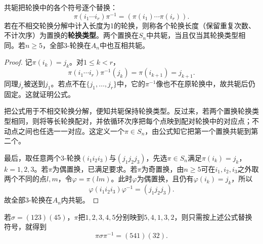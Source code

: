 \begin{proposition}
共轭把轮换中的各个符号逐个替换：
\[
\pi(i_1\cdots i_r)\pi^{-1}
=(\pi(i_1)\cdots\pi(i_r)).
\]
若在不相交轮换分解中计入长度为1的轮换，则称各个轮换长度（保留重复次数、不计次序）为置换的\textbf{轮换类型}。两个置换在$S_n$中共轭，当且仅当其轮换类型相同。若$n\geq5$，全部3-轮换在$A_n$中也互相共轭。
\end{proposition}
\begin{proof}
记$\pi(i_k)=j_k$。对$1\leq k<r$，
\[
\pi(i_1\cdots i_r)\pi^{-1}(j_k)
=\pi(i_{k+1})=j_{k+1}.
\]
同理$j_r$被送到$j_1$。若点不在$\{j_1,\ldots,j_r\}$中，它的$\pi^{-1}$像也不在原轮换中，故共轭后仍固定。这就证明公式。

把公式用于不相交轮换分解，便知共轭保持轮换类型。反过来，若两个置换轮换类型相同，则将等长轮换配对，并依循环次序把每个点映到配对轮换中的对应点；不动点之间也任选一一对应。这定义一个$\pi\in S_n$，由公式知它把第一个置换共轭到第二个。

最后，取任意两个3-轮换$(i_1i_2i_3)$与$(j_1j_2j_3)$，先选$\pi\in S_n$满足$\pi(i_k)=j_k$，$k=1,2,3$。若$\pi$为偶置换，已满足要求。若$\pi$为奇置换，由$n\geq5$可在$i_1,i_2,i_3$之外取两个不同的点$l,m$，令$\varphi=\pi(lm)$。此时$\varphi$为偶置换，且仍有$\varphi(i_k)=j_k$，所以
\[
\varphi(i_1i_2i_3)\varphi^{-1}=(j_1j_2j_3).
\]
故全部3-轮换在$A_n$内共轭。
\end{proof}

\begin{example}
若$\sigma=(123)(45)$，$\pi$把$1,2,3,4,5$分别映到$5,4,1,3,2$，则只需按上述公式替换符号，就得到
\[
\pi\sigma\pi^{-1}=(541)(32).
\]
\end{example}

